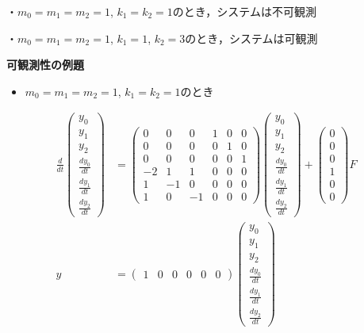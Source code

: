 \documentclass[a4paper,11pt,fleqn]{jreport}
\begin{document}
・$m_0=m_1=m_2=1$, $k_1=k_2=1$のとき，システムは不可観測

・$m_0=m_1=m_2=1$, $k_1=1$, $k_2=3$のとき，システムは可観測

\newpage
\noindent
{\bf 可観測性の例題}

\begin{itemize}
\item $m_0=m_1=m_2=1$, $k_1=k_2=1$のとき
\end{itemize}
\begin{align}
 \frac{d}{dt} \left(\begin{array}{c}
	         y_0 \\
		     y_1 \\
		     y_2 \\
		     \frac{dy_0}{dt} \\
		     \frac{dy_1}{dt} \\
		     \frac{dy_2}{dt}
		    \end{array}\right)
 &=
 \left(\begin{array}{rrrrrr}
        0 & 0 & 0 & 1 & 0 & 0      \\
        0 & 0 & 0 & 0 & 1 & 0      \\
        0 & 0 & 0 & 0 & 0 & 1      \\
	-2& 1 & 1 & 0 & 0 & 0 \\
	1 & -1& 0 & 0 & 0 & 0 \\
	1 & 0 & -1& 0 & 0 & 0 
       \end{array}\right)
 \left(\begin{array}{c}
	         y_0 \\
		     y_1 \\
		     y_2 \\
		     \frac{dy_0}{dt} \\
		     \frac{dy_1}{dt} \\
		     \frac{dy_2}{dt}
       \end{array}\right)
 +
 \left(\begin{array}{c}
        0 \\
        0 \\
        0 \\
	    1 \\
	    0 \\
	    0 
       \end{array}\right)
        F
\nonumber
\\
y &=
 \left(\begin{array}{cccccc}
         1 & 0 & 0 & 0 & 0 & 0
       \end{array}\right)
 \left(\begin{array}{c}
	         y_0 \\
		     y_1 \\
		     y_2 \\
		     \frac{dy_0}{dt} \\
		     \frac{dy_1}{dt} \\
		     \frac{dy_2}{dt}
       \end{array}\right)
\nonumber
\end{align}
\end{document}
